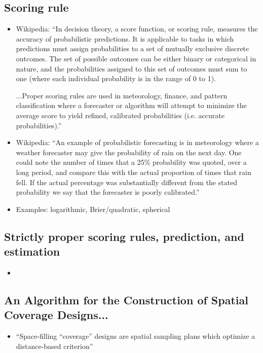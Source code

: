 \documentclass{article}
\begin{document}
\subsection*{Scoring rule}
\begin{itemize}
\item Wikipedia: ``In decision theory, a score function, or scoring rule, measures the accuracy of probabilistic predictions. It is applicable to tasks in which predictions must assign probabilities to a set of mutually exclusive discrete outcomes. The set of possible outcomes can be either binary or categorical in nature, and the probabilities assigned to this set of outcomes must sum to one (where each individual probability is in the range of 0 to 1). 

...Proper scoring rules are used in meteorology, finance, and pattern classification where a forecaster or algorithm will attempt to minimize the average score to yield refined, calibrated probabilities (i.e. accurate probabilities).''
\item Wikipedia: ``An example of probabilistic forecasting is in meteorology where a weather forecaster may give the probability of rain on the next day. One could note the number of times that a 25\% probability was quoted, over a long period, and compare this with the actual proportion of times that rain fell. If the actual percentage was substantially different from the stated probability we say that the forecaster is poorly calibrated.''
\item Examples: logarithmic, Brier/quadratic, spherical
\end{itemize}

\subsection*{Strictly proper scoring rules, prediction, and estimation }
\citep{Gneiting2007}
\begin{itemize}
\item 
\end{itemize}



\subsection*{An Algorithm for the Construction of Spatial Coverage Designs... \citep{Nychka1998}}
\begin{itemize}
\item ``Space-filling ``coverage'' designs are spatial sampling plans which optimize a distance-based criterion''
\end{itemize}
\end{document}
